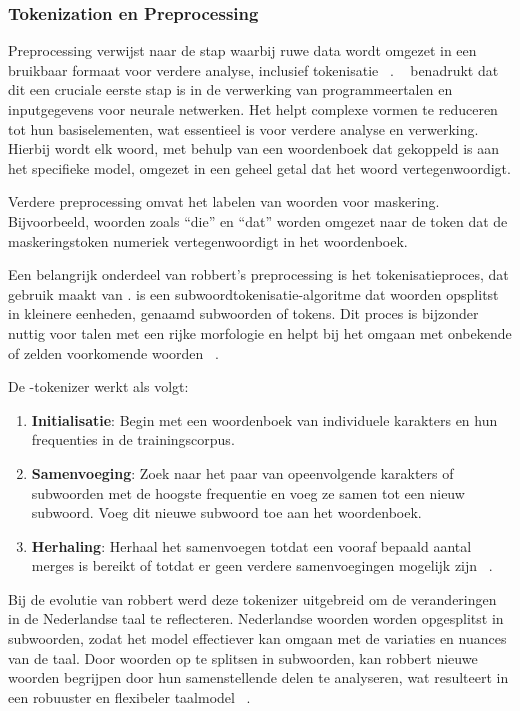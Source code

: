 \subsubsection{Tokenization en Preprocessing}

Preprocessing verwijst naar de stap waarbij ruwe data wordt omgezet in een bruikbaar formaat voor verdere analyse, inclusief tokenisatie ~\autocite{Chai2022}. ~\textcite{Friedman2023} benadrukt dat dit een cruciale eerste stap is in de verwerking van programmeertalen en inputgegevens voor neurale netwerken. Het helpt complexe vormen te reduceren tot hun basiselementen, wat essentieel is voor verdere analyse en verwerking. Hierbij wordt elk woord, met behulp van een woordenboek dat gekoppeld is aan het specifieke model, omgezet in een geheel getal dat het woord vertegenwoordigt.

Verdere preprocessing omvat het labelen van woorden voor maskering. Bijvoorbeeld, woorden zoals ``die'' en ``dat'' worden omgezet naar de token dat de maskeringstoken numeriek vertegenwoordigt in het woordenboek.

Een belangrijk onderdeel van \gls{robbert}'s preprocessing is het tokenisatieproces, dat gebruik maakt van .  is een subwoordtokenisatie-algoritme dat woorden opsplitst in kleinere eenheden, genaamd subwoorden of tokens. Dit proces is bijzonder nuttig voor talen met een rijke morfologie en helpt bij het omgaan met onbekende of zelden voorkomende woorden ~\autocite{Sennrich2016}.

De -tokenizer werkt als volgt:
\begin{enumerate}
    \item \textbf{Initialisatie}: Begin met een woordenboek van individuele karakters en hun frequenties in de trainingscorpus.
    \item \textbf{Samenvoeging}: Zoek naar het paar van opeenvolgende karakters of subwoorden met de hoogste frequentie en voeg ze samen tot een nieuw subwoord. Voeg dit nieuwe subwoord toe aan het woordenboek.
    \item \textbf{Herhaling}: Herhaal het samenvoegen totdat een vooraf bepaald aantal merges is bereikt of totdat er geen verdere samenvoegingen mogelijk zijn ~\autocite{HuggingFace2023BPE}.
\end{enumerate}


Bij de evolutie van \gls{robbert} werd deze tokenizer uitgebreid om de veranderingen in de Nederlandse taal te reflecteren. Nederlandse woorden worden opgesplitst in subwoorden, zodat het model effectiever kan omgaan met de variaties en nuances van de taal. Door woorden op te splitsen in subwoorden, kan \gls{robbert} nieuwe woorden begrijpen door hun samenstellende delen te analyseren, wat resulteert in een robuuster en flexibeler taalmodel ~\autocite{Delobelle2022}.

